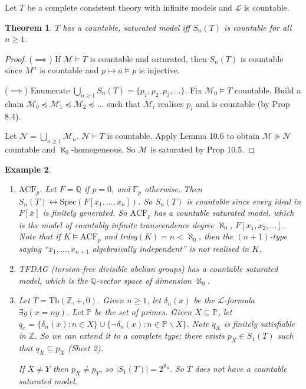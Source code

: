 \documentclass[]{article}
\theoremstyle{custhm}
\newtheorem{theorem}{Theorem}[section]
\theoremstyle{cusdef}
\theoremstyle{custhm}
\theoremstyle{custhm}
\theoremstyle{custhm}
\theoremstyle{ex}
\newtheorem{ex}[theorem]{Example}
\theoremstyle{custhm}
\theoremstyle{cusdef}
\theoremstyle{remark}
\theoremstyle{remark}
\theoremstyle{numremark}
\newcommand{\Z}{\mathbb{Z}}
\newcommand{\Q}{\mathbb{Q}}
\renewcommand{\L}{\mathcal{L}}
\newcommand{\M}{\mathcal{M}}
\renewcommand{\bar}{\overline}
\newcommand{\Th}{\textrm{Th}}
\newcommand{\N}{\mathcal{N}}
\newcommand{\acf}{\textrm{ACF}}
\newcommand{\F}{\mathbb{F}}
\renewcommand{\subset}{\subseteq}
\begin{document}
Let $T$ be a complete consistent theory with infinite models and $\L$ is countable.

\begin{theorem}
$T$ has a countable, saturated model iff $S_n(T)$ is countable for all $n\ge1$.
\end{theorem}
\begin{proof}
($\implies$) If $\M\models T$ is countable and saturated, then $S_n(T)$ is countable since $M^n$ is countable and $p\mapsto \bar{a}\models p$ is injective.

($\implies$) Enumerate $\bigcup_{n\ge 1}S_n(T) = \{p_1,p_2,p_3,\dots\}$. Fix $\M_0\models T$ countable. Build a chain $\M_0\preceq\M_1\preceq\M_2\preceq\dots$ such that $\M_i$ realises $p_i$ and is countable (by Prop 8.4).

Let $\N = \bigcup_{n\ge 1}\M_n$. $\N\models T$ is countable. Apply Lemma 10.6 to obtain $\M\succeq \N$ countable and $\aleph_0$-homogeneous. So $\M$ is saturated by Prop 10.5.
\end{proof}

\begin{ex}\ 
\begin{enumerate}[label=(\arabic*)]
	\item $\acf_p$. Let $F = \Q$ if $p = 0$, and $\F_p$ otherwise. Then $S_n(T)\leftrightarrow \textrm{Spec}(F[x_1,\dots,x_n])$. So $S_n(T)$ is countable since every ideal in $F[\bar{x}]$ is finitely generated. So $\acf_p$ has a countable saturated model, which is the model of countably infinite transcendence degree $\aleph_0$, $\overline{F[x_1,x_2,\dots]}$. Note that if $K\models \acf_p$ and trdeg$(K) = n < \aleph_0$, then the $(n+1)$-type saying ``$x_1,\dots,x_{n+1}$ algebraically independent'' is not realised in $K$.
	
	\item TFDAG (torsion-free divisible abelian groups) has a countable saturated model, which is the $\Q$-vector space of dimension $\aleph_0$.
	
	\item Let $T = \Th(\Z,+,0)$. Given $n\ge 1$, let $\delta_n(x)$ be the $\L$-formula $\exists y(x = ny)$. Let $\mathbb{P}$ be the set of primes. Given $X\subset \mathbb{P}$, let $q_x = \{\delta_n(x):n\in X\}\cup\{\neg\delta_n(x):n\in \mathbb{P}\backslash X\}$. Note $q_X$ is finitely satisfiable in $\Z$. So we can extend it to a complete type; there exists $p_X \in S_1(T)$ such that $q_X \subset p_X$ (Sheet 2).
	
	If $X \ne Y$ then $p_X \ne p_Y$, so $|S_1(T)| = 2^{\aleph_0}$. So $T$ does not have a countable saturated model.
\end{enumerate}
\end{ex}
\end{document}
